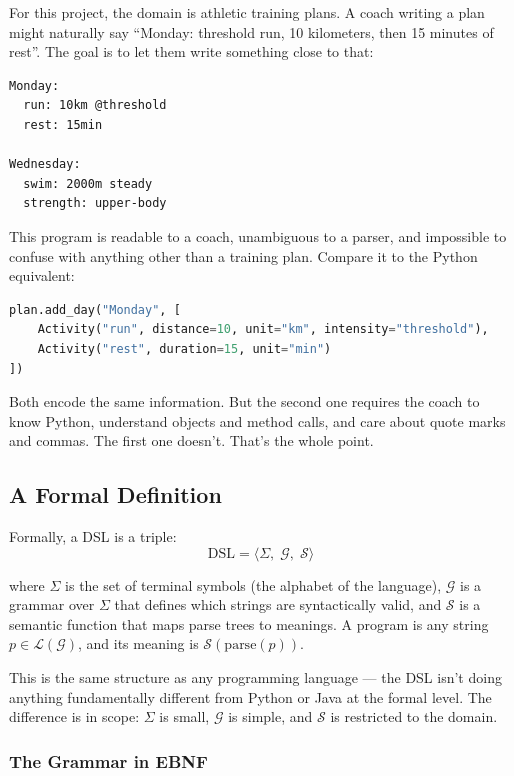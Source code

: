 For this project, the domain is athletic training plans. A coach writing a plan might
naturally say ``Monday: threshold run, 10 kilometers, then 15 minutes of rest''. The
goal is to let them write something close to that:

\begin{lstlisting}
Monday:
  run: 10km @threshold
  rest: 15min

Wednesday:
  swim: 2000m steady
  strength: upper-body
\end{lstlisting}

This program is readable to a coach, unambiguous to a parser, and impossible to confuse
with anything other than a training plan. Compare it to the Python equivalent:

\begin{lstlisting}[language=Python]
plan.add_day("Monday", [
    Activity("run", distance=10, unit="km", intensity="threshold"),
    Activity("rest", duration=15, unit="min")
])
\end{lstlisting}

Both encode the same information. But the second one requires the coach to know Python,
understand objects and method calls, and care about quote marks and commas. The first
one doesn't. That's the whole point.

\subsection{A Formal Definition}

Formally, a DSL is a triple:
\[
  \text{DSL} = \langle \Sigma,\; \mathcal{G},\; \mathcal{S} \rangle
\]

where $\Sigma$ is the set of terminal symbols (the alphabet of the language), $\mathcal{G}$
is a grammar over $\Sigma$ that defines which strings are syntactically valid, and
$\mathcal{S}$ is a semantic function that maps parse trees to meanings. A program is any
string $p \in \mathcal{L}(\mathcal{G})$, and its meaning is $\mathcal{S}(\text{parse}(p))$.

This is the same structure as any programming language --- the DSL isn't doing anything
fundamentally different from Python or Java at the formal level. The difference is in
scope: $\Sigma$ is small, $\mathcal{G}$ is simple, and $\mathcal{S}$ is restricted to
the domain.

\subsubsection{The Grammar in EBNF}

